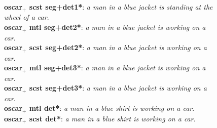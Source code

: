 \begin{figure}[H]
{        \textbf{\acrshort{oscar}$_+$ \acrshort{scst} seg+det1*}: \textit{a man in a blue jacket is standing at the wheel of a car}.\\
        \textbf{\acrshort{oscar}$_+$ \acrshort{mtl} seg+det2*}: \textit{a man in a blue jacket is working on a car}.\\
        \textbf{\acrshort{oscar}$_+$ \acrshort{scst} seg+det2*}: \textit{a man in a blue jacket is working on a car}.\\
        \textbf{\acrshort{oscar}$_+$ \acrshort{mtl} seg+det3*}: \textit{a man in a blue jacket is working on a car}.\\
        \textbf{\acrshort{oscar}$_+$ \acrshort{scst} seg+det3*}: \textit{a man in a blue jacket is working on a car}.\\
        \textbf{\acrshort{oscar}$_+$ \acrshort{mtl} det*}: \textit{a man in a blue shirt is working on a car}.\\
        \textbf{\acrshort{oscar}$_+$ \acrshort{scst} det*}: \textit{a man in a blue shirt is working on a car}.
        }
        \label{fig:test5}
\end{figure}

